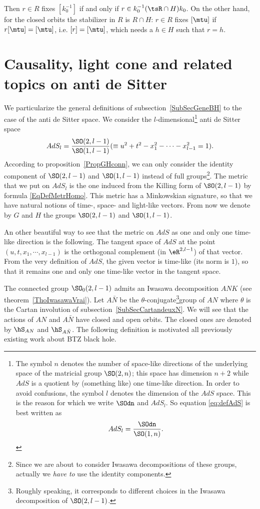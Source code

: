 Then $r\in R$ fixes $[k_0^{-1}]$ if and only if $r\in k_0^{-1}(\tsR\cap H)k_0$. On the other hand, for the closed orbits the stabilizer in $R$ is $R\cap H$: $r\in R$ fixes $[\mtu]$ if $r[\mtu]=[\mtu]$, i.e. $[r]=[\mtu]$, which needs a $h\in H$ such that $r=h$.

\section{Causality, light cone and related topics on anti de Sitter} \label{SecCausal}

We particularize the general definitions of subsection~\ref{SubSecGeneBH} to the case of the anti de Sitter space. We consider the $l$-dimensional\footnote{The symbol $n$ denotes the number of space-like directions of the underlying space of the matricial group $\SO(2,n)$; this space has dimension $n+2$ while $AdS$ is a quotient by (something like) one time-like direction. In order to avoid confusions, the symbol $l$ denotes the dimension of the $AdS$ space. This is the reason for which we write $\SOdn$ and $AdS_l$. %
    So equation \eqref{eq:defAdS} is best written as \[AdS_l=\frac{\SOdn}{\SO(1,n)}.\]} anti de Sitter space
\begin{equation}    \label{eq:defAdS}
  AdS_l=\frac{ \SO(2,l-1) }{ \SO(1,l-1) }(\equiv u^2+t^2-x_1^2-\cdots-x_{l-1}^2=1).
 \end{equation}
According to proposition~\ref{PropGHconn}, we can only consider the identity component of $\SO(2,l-1)$ and $\SO(1,l-1)$ instead of full groups\footnote{Since we are about to consider Iwasawa decompositions of these groups, actually we \emph{have to} use the identity components.}. The metric that we put on $AdS_l$ is the one induced from the Killing form of $\SO(2,l-1)$ by formula \eqref{EqDefMetrHomo}. This metric has a Minkowskian signature, so that we have  natural notions of time-, space- and light-like vectors. From now we denote by $G$ and $H$ the groups $\SO(2,l-1)$ and $\SO(1,l-1)$.

An other beautiful way to see that the metric on $AdS$ as one and only one time-like direction is the following. The tangent space of $AdS$ at the point $(u,t,x_1,\cdots,x_{l-1})$ is the orthogonal complement (in $\eR^{2,l-1}$) of that vector. From the very definition of $AdS$, the given vector is time-like (its norm is $1$), so that it remains one and only one time-like vector in the tangent space.

The connected group $\SO_0(2,l-1)$ admits an Iwasawa decomposition $ANK$ (see theorem~\ref{ThoIwasawaVrai}). Let $A\bar N$ be the $\theta$-conjugate\footnote{Roughly speaking, it corresponds to different choices in the Iwasawa decomposition of $\SO(2,l-1)$.}group of $AN$ where $\theta$ is the Cartan involution of subsection~\ref{SubSecCartandeuxN}. We will see that the actions of $AN$ and $A\bar N$ have closed and open orbits. The closed ones are denoted by $\hS_{AN}$ and $\hS_{A\bar N}$. The following definition is motivated all previously existing work about BTZ black hole.


